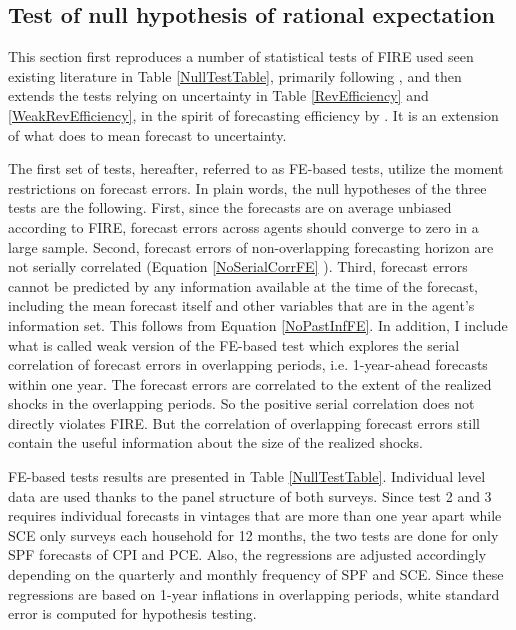 \documentclass[12pt]{article}
\begin{document}
	
	\subsection{Test of null hypothesis of rational expectation}\label{NullTest}
	
	This section first reproduces a number of statistical tests of FIRE used seen existing literature in Table \ref{NullTestTable}, primarily following \citet{mankiw2003disagreement},  and then extends the tests relying on uncertainty in Table \ref{RevEfficiency} and \ref{WeakRevEfficiency}, in the spirit of forecasting efficiency by \citet{nordhaus1987forecasting}. It is an extension of what \citet{fuhrer2018intrinsic} does to mean forecast to uncertainty.  
	
	The first set of tests, hereafter, referred to as FE-based tests, utilize the moment restrictions on forecast errors. In plain words, the null hypotheses of the three tests are the following. First, since the forecasts are on average unbiased according to FIRE, forecast errors across agents should converge to zero in a large sample. Second, forecast errors of non-overlapping forecasting horizon are not serially correlated (Equation \ref{NoSerialCorrFE} ).  Third, forecast errors cannot be predicted by any information available at the time of the forecast, including the mean forecast itself and other variables that are in the agent's information set. This follows from Equation \ref{NoPastInfFE}. In addition, I include what is called weak version of the FE-based test which explores the serial correlation of forecast errors in overlapping periods,  i.e. 1-year-ahead forecasts within one year. The forecast errors are correlated to the extent of the realized shocks in the overlapping periods. So the positive serial correlation does not directly violates FIRE. But the correlation of overlapping forecast errors still contain the useful information about the size of the realized shocks. 
	
	FE-based tests results are presented in Table \ref{NullTestTable}. Individual level data are used thanks to the panel structure of both surveys. Since test 2 and 3 requires individual forecasts in vintages that are more than one year apart while SCE only surveys each household for 12 months, the two tests are done for only SPF forecasts of CPI and PCE. Also, the regressions are adjusted accordingly depending on the quarterly and monthly frequency of SPF and SCE. Since these regressions are based on 1-year inflations in overlapping periods, white standard error is computed for hypothesis testing. 
	
\end{document}

